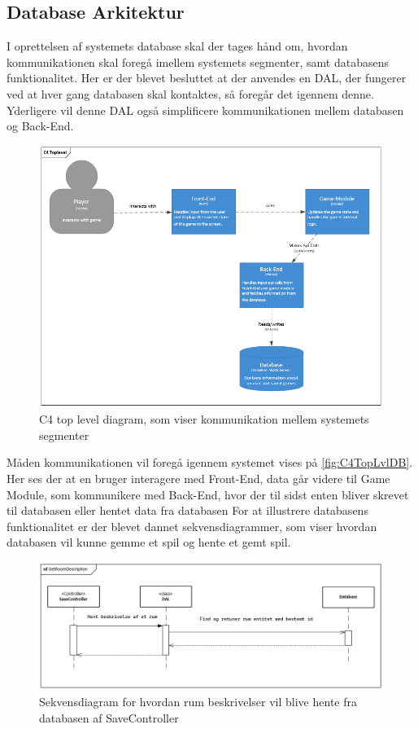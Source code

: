 \subsection{Database Arkitektur}

I oprettelsen af systemets database skal der tages hånd om, hvordan kommunikationen skal foregå imellem systemets segmenter, samt databasens funktionalitet. Her er der blevet besluttet at der anvendes en DAL, der fungerer ved at hver gang databasen skal kontaktes, så foregår det igennem denne. Yderligere vil denne DAL også simplificere kommunikationen mellem databasen og Back-End.

\begin{figure}[H]
\centering
\includegraphics[width = \textwidth]{02-Body/Images/C4TopLvlDB}
\caption{C4 top level diagram, som viser kommunikation mellem systemets segmenter}
\label{fig:C4TopLvlDB}
\end{figure}

Måden kommunikationen vil foregå igennem systemet vises på \autoref{fig:C4TopLvlDB}. Her ses der at en bruger interagere med Front-End, data går videre til Game Module, som kommunikere med Back-End, hvor der til sidst enten bliver skrevet til databasen eller hentet data fra databasen
For at illustrere databasens funktionalitet er der blevet dannet sekvensdiagrammer, som viser hvordan databasen vil kunne gemme et spil og hente et gemt spil.

\begin{figure}[H]
\centering
\includegraphics[width = \textwidth]{02-Body/Images/RoomDescriptionsDB.PNG}
\caption{Sekvensdiagram for hvordan rum beskrivelser vil blive hente fra databasen af SaveController}
\label{fig:RoomDescriptionsDB}
\end{figure}

